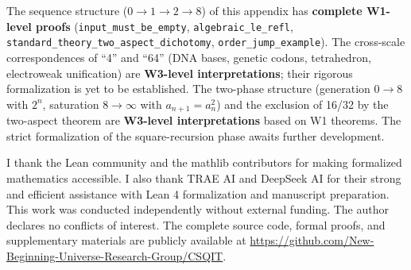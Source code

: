 \documentclass[aps,prd,twocolumn,nofootinbib,floatfix]{revtex4-2}
\begin{document}
The sequence structure ($0\to 1\to 2\to 8$) of this appendix has \textbf{complete W1-level proofs} (\texttt{input\_must\_be\_empty}, \texttt{algebraic\_le\_refl}, \texttt{standard\_theory\_two\_aspect\_dichotomy}, \texttt{order\_jump\_example}). The cross-scale correspondences of ``4'' and ``64'' (DNA bases, genetic codons, tetrahedron, electroweak unification) are \textbf{W3-level interpretations}; their rigorous formalization is yet to be established. The two-phase structure (generation $0\to 8$ with $2^n$, saturation $8\to \infty$ with $a_{n+1} = a_n^2$) and the exclusion of 16/32 by the two-aspect theorem are \textbf{W3-level interpretations} based on W1 theorems. The strict formalization of the square-recursion phase awaits further development.

\acknowledgments

I thank the Lean community and the mathlib contributors for making formalized mathematics accessible. I also thank TRAE AI and DeepSeek AI for their strong and efficient assistance with Lean 4 formalization and manuscript preparation. This work was conducted independently without external funding. The author declares no conflicts of interest. The complete source code, formal proofs, and supplementary materials are publicly available at \url{https://github.com/New-Beginning-Universe-Research-Group/CSQIT}.


\end{document}
